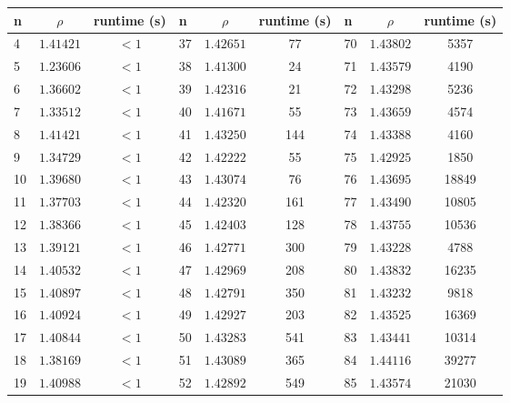 \begin{tabular}{|lcc||lcc||lcc|}
    \hline
    n & $\rho$ & runtime (s) & n & $\rho$ & runtime (s) & n & $\rho$ & runtime (s) \\
    \hline
    \num{4} & $1.41421$ & $<1$ & \num{37} & $1.42651$ & \num{77} & \num{70} & $\mathbf{1.43802}$ & \num{5357} \\
    \num{5} & $1.23606$ & $<1$ & \num{38} & $1.41300$ & \num{24} & \num{71} & $\mathbf{1.43579}$ & \num{4190} \\
    \num{6} & $1.36602$ & $<1$ & \num{39} & $1.42316$ & \num{21} & \num{72} & $\mathbf{1.43298}$ & \num{5236} \\
    \num{7} & $1.33512$ & $<1$ & \num{40} & $1.41671$ & \num{55} & \num{73} & $\mathbf{1.43659}$ & \num{4574} \\
    \num{8} & $1.41421$ & $<1$ & \num{41} & $\mathbf{1.43250}$ & \num{144} & \num{74} & $\mathbf{1.43388}$ & \num{4160} \\
    \num{9} & $1.34729$ & $<1$ & \num{42} & $1.42222$ & \num{55} & \num{75} & $1.42925$ & \num{1850} \\
    \num{10} & $1.39680$ & $<1$ & \num{43} & $1.43074$ & \num{76} & \num{76} & $\mathbf{1.43695}$ & \num{18849} \\
    \num{11} & $1.37703$ & $<1$ & \num{44} & $1.42320$ & \num{161} & \num{77} & $\mathbf{1.43490}$ & \num{10805} \\
    \num{12} & $1.38366$ & $<1$ & \num{45} & $1.42403$ & \num{128} & \num{78} & $\mathbf{1.43755}$ & \num{10536} \\
    \num{13} & $1.39121$ & $<1$ & \num{46} & $1.42771$ & \num{300} & \num{79} & $\mathbf{1.43228}$ & \num{4788} \\
    \num{14} & $1.40532$ & $<1$ & \num{47} & $1.42969$ & \num{208} & \num{80} & $\mathbf{1.43832}$ & \num{16235} \\
    \num{15} & $1.40897$ & $<1$ & \num{48} & $1.42791$ & \num{350} & \num{81} & $\mathbf{1.43232}$ & \num{9818} \\
    \num{16} & $1.40924$ & $<1$ & \num{49} & $1.42927$ & \num{203} & \num{82} & $\mathbf{1.43525}$ & \num{16369} \\
    \num{17} & $1.40844$ & $<1$ & \num{50} & $\mathbf{1.43283}$ & \num{541} & \num{83} & $\mathbf{1.43441}$ & \num{10314} \\
    \num{18} & $1.38169$ & $<1$ & \num{51} & $\mathbf{1.43089}$ & \num{365} & \num{84} & $\mathbf{1.44116}$ & \num{39277} \\
    \num{19} & $1.40988$ & $<1$ & \num{52} & $1.42892$ & \num{549} & \num{85} & $\mathbf{1.43574}$ & \num{21030} \\

\end{tabular}
